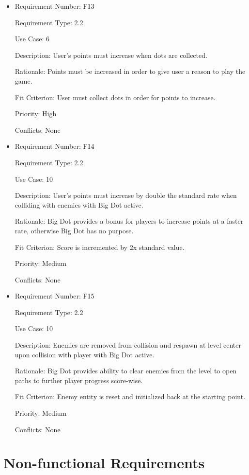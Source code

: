 \documentclass[12pt, titlepage]{article}
\begin{document}
\begin{itemize}
\item
Requirement Number: F13

Requirement Type: 2.2

Use Case: 6

Description: User's points must increase when dots are collected.

Rationale: Points must be increased in order to give user a reason to play the game.

Fit Criterion: User must collect dots in order for points to increase.

Priority: High

Conflicts: None
\end{itemize}

\begin{itemize}
\item
Requirement Number: F14

Requirement Type: 2.2

Use Case: 10

Description: User's points must increase by double the standard rate when colliding with enemies with Big Dot active.

Rationale: Big Dot provides a bonus for players to increase points at a faster rate, otherwise Big Dot has no purpose.

Fit Criterion: Score is incremented by 2x standard value.

Priority: Medium

Conflicts: None
\end{itemize}

\begin{itemize}
\item
Requirement Number: F15

Requirement Type: 2.2

Use Case: 10

Description: Enemies are removed from collision and respawn at level center upon collision with player with Big Dot active.

Rationale: Big Dot provides ability to clear enemies from the level to open paths to further player progress score-wise.

Fit Criterion: Enemy entity is reset and initialized back at the starting point.

Priority: Medium

Conflicts: None
\end{itemize}


\section{Non-functional Requirements}
\end{document}
